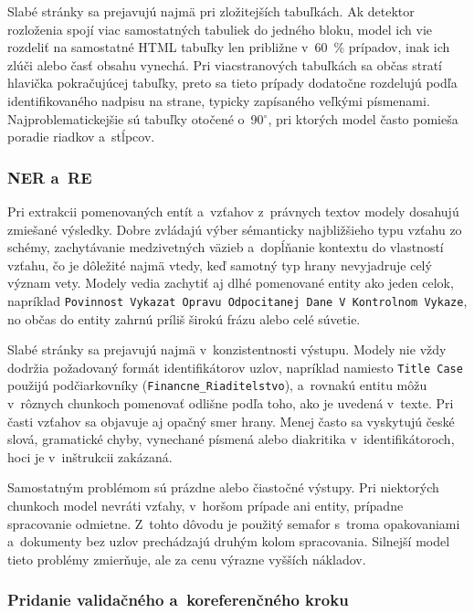 Slabé stránky sa prejavujú najmä pri zložitejších tabuľkách. Ak detektor rozloženia spojí viac samostatných tabuliek do jedného bloku, model ich vie rozdeliť na samostatné HTML tabuľky len približne v~60~\% prípadov, inak ich zlúči alebo časť obsahu vynechá. Pri viacstranových tabuľkách sa občas stratí hlavička pokračujúcej tabuľky, preto sa tieto prípady dodatočne rozdelujú podľa identifikovaného nadpisu na strane, typicky zapísaného veľkými písmenami. Najproblematickejšie sú tabuľky otočené o~90$^\circ$, pri ktorých model často pomieša poradie riadkov a~stĺpcov.

\subsubsection{NER a~RE}

Pri extrakcii pomenovaných entít a~vzťahov z~právnych textov modely dosahujú zmiešané výsledky. Dobre zvládajú výber sémanticky najbližšieho typu vzťahu zo schémy, zachytávanie medzivetných väzieb a~dopĺňanie kontextu do vlastností vzťahu, čo je dôležité najmä vtedy, keď samotný typ hrany nevyjadruje celý význam vety. Modely vedia zachytiť aj dlhé pomenované entity ako jeden celok, napríklad \texttt{Povinnost Vykazat Opravu Odpocitanej Dane V~Kontrolnom Vykaze}, no občas do entity zahrnú príliš širokú frázu alebo celé súvetie.

Slabé stránky sa prejavujú najmä v~konzistentnosti výstupu. Modely nie vždy dodržia požadovaný formát identifikátorov uzlov, napríklad namiesto \texttt{Title Case} použijú podčiarkovníky (\texttt{Financne\_Riaditelstvo}), a~rovnakú entitu môžu v~rôznych chunkoch pomenovať odlišne podľa toho, ako je uvedená v~texte. Pri časti vzťahov sa objavuje aj opačný smer hrany. Menej často sa vyskytujú české slová, gramatické chyby, vynechané písmená alebo diakritika v~identifikátoroch, hoci je v~inštrukcii zakázaná.

Samostatným problémom sú prázdne alebo čiastočné výstupy. Pri niektorých chunkoch model nevráti vzťahy, v~horšom prípade ani entity, prípadne spracovanie odmietne. Z~tohto dôvodu je použitý semafor s~troma opakovaniami a~dokumenty bez uzlov prechádzajú druhým kolom spracovania. Silnejší model tieto problémy zmierňuje, ale za cenu výrazne vyšších nákladov.

\subsubsection{Pridanie validačného a~koreferenčného kroku}

